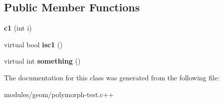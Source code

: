 \subsection*{Public Member Functions}
\begin{DoxyCompactItemize}
\item 
\hypertarget{classc1_a16f80cd1949866503e8de3d0d5a86996}{{\bfseries c1} (int i)}\label{classc1_a16f80cd1949866503e8de3d0d5a86996}

\item 
\hypertarget{classc1_a416f2fdd0095878a1662c59b723eccdc}{virtual bool {\bfseries isc1} ()}\label{classc1_a416f2fdd0095878a1662c59b723eccdc}

\item 
\hypertarget{classc1_aaeabbd60d265afc206911deab6ba529b}{virtual int {\bfseries something} ()}\label{classc1_aaeabbd60d265afc206911deab6ba529b}

\end{DoxyCompactItemize}


The documentation for this class was generated from the following file\-:\begin{DoxyCompactItemize}
\item 
modules/geom/polymorph-\/test.\-c++\end{DoxyCompactItemize}
